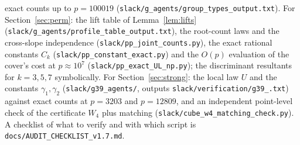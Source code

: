 \documentclass[11pt]{article}
\theoremstyle{remark}
\begin{document}
exact counts up to $p=100019$ (\texttt{slack/\allowbreak g\_\allowbreak agents/\allowbreak group\_\allowbreak types\_\allowbreak output.txt}).  For Section~\ref{sec:perm}: the lift table of Lemma~\ref{lem:lifts}
(\texttt{slack/\allowbreak g\_\allowbreak agents/\allowbreak profile\_\allowbreak table\_\allowbreak output.txt}), the root-count laws and the cross-slope independence (\texttt{slack/\allowbreak pp\_\allowbreak joint\_\allowbreak counts.py}), the exact
rational constants $C_k$ (\texttt{slack/\allowbreak pp\_\allowbreak constant\_\allowbreak exact.py}) and the $O(p)$ evaluation of the cover's cost at $p\approx10^7$
(\texttt{slack/\allowbreak pp\_\allowbreak exact\_\allowbreak UL\_\allowbreak np.py}); the discriminant resultants for $k=3,5,7$ symbolically.  For Section~\ref{sec:strong}: the local law $U$ and
the constants $\gamma_1,\gamma_2$ (\texttt{slack/\allowbreak g39\_\allowbreak agents/\allowbreak }, outputs \texttt{slack/\allowbreak verification/\allowbreak g39\_\allowbreak *.txt}) against exact counts at $p=3203$ and
$p=12809$, and an independent point-level check of the certificate $W_4$ plus matching (\texttt{slack/\allowbreak cube\_\allowbreak w4\_\allowbreak matching\_\allowbreak check.py}).  A checklist of what to verify and with which
script is \texttt{docs/\allowbreak AUDIT\_\allowbreak CHECKLIST\_\allowbreak v1.7.md}.
\end{document}
